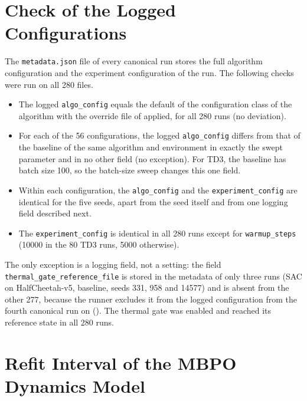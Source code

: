 \section{Check of the Logged Configurations}\label{sec:app-hp-check}

The \texttt{metadata.json} file of every canonical run stores the full algorithm configuration and the experiment configuration of the run.
The following checks were run on all \num{280} files.
\begin{itemize}
  \item The logged \texttt{algo\_\allowbreak config} equals the default of the configuration class of the algorithm with the override file of  applied, for all \num{280} runs (no deviation).
  \item For each of the \num{56} configurations, the logged \texttt{algo\_\allowbreak config} differs from that of the baseline of the same algorithm and environment in exactly the swept parameter and in no other field (no exception).
        For TD3, the baseline has batch size \num{100}, so the batch-size sweep changes this one field.
  \item Within each configuration, the \texttt{algo\_\allowbreak config} and the \texttt{experiment\_\allowbreak config} are identical for the five seeds, apart from the seed itself and from one logging field described next.
  \item The \texttt{experiment\_\allowbreak config} is identical in all \num{280} runs except for \texttt{warmup\_\allowbreak steps} (\num{10000} in the \num{80} TD3 runs, \num{5000} otherwise).
\end{itemize}
The only exception is a logging field, not a setting: the field \texttt{thermal\_\allowbreak gate\_\allowbreak reference\_\allowbreak file} is stored in the metadata of only three runs (SAC on HalfCheetah-v5, baseline, seeds \num{331}, \num{958} and \num{14577}) and is absent from the other \num{277}, because the runner excludes it from the logged configuration from the fourth canonical run on ().
The thermal gate was enabled and reached its reference state in all \num{280} runs.

\section{Refit Interval of the MBPO Dynamics Model}\label{sec:app-hp-refit}


